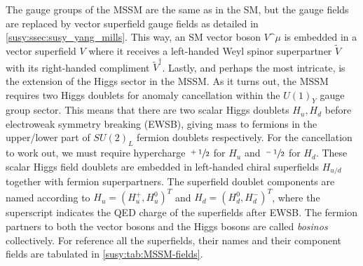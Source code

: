 \documentclass[../main.tex]{subfiles}
\begin{document}
The gauge groups of the MSSM are the same as in the SM, but the gauge fields are replaced by vector superfield gauge fields as detailed in \cref{susy:ssec:susy_yang_mills}.
This way, an SM vector boson \(V\^\mu\) is embedded in a vector superfield \(V\) where it receives a left-handed Weyl spinor superpartner \(\tilde{V}\) with its right-handed compliment \(\tilde{V}^\dagger\).
Lastly, and perhaps the most intricate, is the extension of the Higgs sector in the MSSM.
As it turns out\needcite, the MSSM requires two Higgs doublets for anomaly cancellation within the \(U(1)_Y\) gauge group sector.
This means that there are two scalar Higgs doublets \(H_u, H_d\) before electroweak symmetry breaking (EWSB), giving mass to fermions in the upper/lower part of \(SU(2)_L\) fermion doublets respectively.
For the cancellation to work out, we must require hypercharge \(\sfrac{+1}{2}\) for \(H_u\) and \(\sfrac{-1}{2}\) for \(H_d\).
These scalar Higgs field doublets are embedded in left-handed chiral superfields \(H_{u/d}\) together with fermion superpartners.
The superfield doublet components are named according to \(H_u = (H_u^+, H_u^0)^T\) and \(H_d = (H_d^0, H_d^-)^T\), where the superscript indicates the QED charge of the superfields after EWSB.
The fermion partners to both the vector bosons and the Higgs bosons are called \emph{bosinos} collectively.
For reference all the superfields, their names and their component fields are tabulated in \cref{susy:tab:MSSM-fields}.
\end{document}
